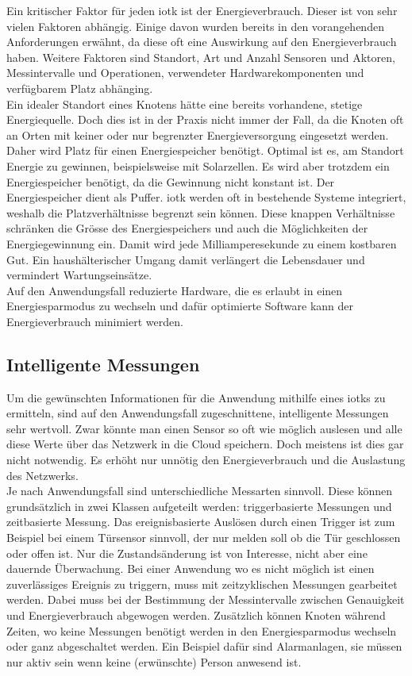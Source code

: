 Ein kritischer Faktor für jeden \gls{iotk} ist der Energieverbrauch. Dieser ist von sehr vielen Faktoren abhängig. Einige davon wurden bereits in den vorangehenden Anforderungen erwähnt, da diese oft eine Auswirkung auf den Energieverbrauch haben. Weitere Faktoren sind Standort, Art und Anzahl Sensoren und Aktoren, Messintervalle und Operationen, verwendeter Hardwarekomponenten und verfügbarem Platz abhänging.\\
Ein idealer Standort eines Knotens hätte eine bereits vorhandene, stetige Energiequelle. Doch dies ist in der Praxis nicht immer der Fall, da die Knoten oft an Orten mit keiner oder nur begrenzter Energieversorgung eingesetzt werden. Daher wird Platz für einen Energiespeicher benötigt. Optimal ist es, am Standort Energie zu gewinnen, beispielsweise mit Solarzellen. Es wird aber trotzdem ein Energiespeicher benötigt, da die Gewinnung nicht konstant ist. Der Energiespeicher dient als Puffer. \gls{iotk} werden oft in bestehende Systeme integriert, weshalb die Platzverhältnisse begrenzt sein können. Diese knappen Verhältnisse schränken die Grösse des Energiespeichers und auch die Möglichkeiten der Energiegewinnung ein. Damit wird jede Milliamperesekunde zu einem kostbaren Gut. Ein haushälterischer Umgang damit verlängert die Lebensdauer und vermindert Wartungseinsätze.\\
Auf den Anwendungsfall reduzierte Hardware, die es erlaubt in einen Energiesparmodus zu wechseln und dafür optimierte Software kann der Energieverbrauch minimiert werden.

\subsection*{Intelligente Messungen}

Um die gewünschten Informationen für die Anwendung mithilfe eines \glspl{iotk} zu ermitteln, sind auf den Anwendungsfall zugeschnittene, intelligente Messungen sehr wertvoll. Zwar könnte man einen Sensor so oft wie möglich auslesen und alle diese Werte über das Netzwerk in die Cloud speichern. Doch meistens ist dies gar nicht notwendig. Es erhöht nur unnötig den Energieverbrauch und die Auslastung des Netzwerks.\\
Je nach Anwendungsfall sind unterschiedliche Messarten sinnvoll. Diese können grundsätzlich in zwei Klassen aufgeteilt werden: triggerbasierte Messungen und zeitbasierte Messung. Das ereignisbasierte Auslösen durch einen Trigger ist zum Beispiel bei einem Türsensor sinnvoll, der nur melden soll ob die Tür geschlossen oder offen ist. Nur die Zustandsänderung ist von Interesse, nicht aber eine dauernde Überwachung. Bei einer Anwendung wo es nicht möglich ist einen zuverlässiges Ereignis zu triggern, muss mit zeitzyklischen Messungen gearbeitet werden. Dabei muss bei der Bestimmung der Messintervalle zwischen Genauigkeit und Energieverbrauch abgewogen werden. Zusätzlich können Knoten während Zeiten, wo keine Messungen benötigt werden in den Energiesparmodus wechseln oder ganz abgeschaltet werden. Ein Beispiel dafür sind Alarmanlagen, sie müssen nur aktiv sein wenn keine (erwünschte) Person anwesend ist.

